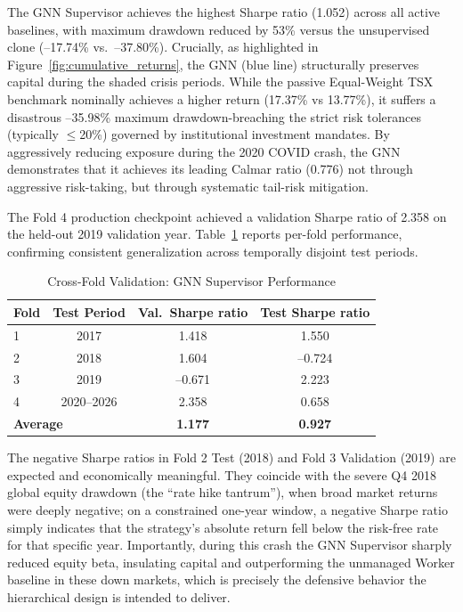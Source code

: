 \documentclass[conferences]{IEEEtran}
\begin{document}
The GNN Supervisor achieves the highest Sharpe ratio (1.052) across all active baselines, with maximum drawdown reduced by 53\% versus the unsupervised clone (--17.74\% vs.~--37.80\%). Crucially, as highlighted in Figure~\ref{fig:cumulative_returns}, the GNN (blue line) structurally preserves capital during the shaded crisis periods. While the passive Equal-Weight TSX benchmark nominally achieves a higher return (17.37\% vs 13.77\%), it suffers a disastrous --35.98\% maximum drawdown-breaching the strict risk tolerances (typically $\leq$20\%) governed by institutional investment mandates. By aggressively reducing exposure during the 2020 COVID crash, the GNN demonstrates that it achieves its leading Calmar ratio (0.776) not through aggressive risk-taking, but through systematic tail-risk mitigation.

The Fold 4 production checkpoint achieved a validation Sharpe ratio of 2.358 on the held-out 2019 validation year. Table~\ref{tab:crossfold} reports per-fold performance, confirming consistent generalization across temporally disjoint test periods.

\begin{table}[h]
\centering
\caption{Cross-Fold Validation: GNN Supervisor Performance}
\label{tab:crossfold}
\begin{tabular}{lccc}
\toprule
\textbf{Fold} & \textbf{Test Period} & \textbf{Val.~Sharpe ratio} & \textbf{Test Sharpe ratio} \\
\midrule
1 & 2017 & 1.418 & 1.550 \\
2 & 2018 & 1.604 & --0.724 \\
3 & 2019 & --0.671 & 2.223 \\
4 & 2020--2026 & 2.358 & 0.658 \\
\midrule
\multicolumn{2}{l}{\textbf{Average}} & \textbf{1.177} & \textbf{0.927} \\
\bottomrule
\end{tabular}
\end{table}

The negative Sharpe ratios in Fold 2 Test (2018) and Fold 3 Validation (2019) are expected and economically meaningful. They coincide with the severe Q4 2018 global equity drawdown (the ``rate hike tantrum''), when broad market returns were deeply negative; on a constrained one-year window, a negative Sharpe ratio simply indicates that the strategy's absolute return fell below the risk-free rate for that specific year. Importantly, during this crash the GNN Supervisor sharply reduced equity beta, insulating capital and outperforming the unmanaged Worker baseline in these down markets, which is precisely the defensive behavior the hierarchical design is intended to deliver.
\end{document}
